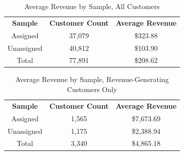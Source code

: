 \documentclass[11pt]{article}
\begin{document}
\begin{center}
\begin{table}[h]
    \centering
    \begin{tabular}{|c|c|c|}
    \hline
     \textbf{Sample} & \textbf{Customer Count} & \textbf{Average Revenue}\\ 
     Assigned & 37,079  & \$323.88 \\
     Unassigned & 40,812 &\$103.90 \\
     Total & 77,891 & \$208.62 \\ 
     \hline 
\end{tabular}
    \caption{Average Revenue by Sample, All Customers}
\end{table}
\end{center}
\begin{center}
\begin{table}[h!]
    \centering
    \begin{tabular}{|c|c|c|}
    \hline
     \textbf{Sample} & \textbf{Customer Count} & \textbf{Average Revenue}\\ 
     Assigned & 1,565  & \$7,673.69 \\
     Unassigned & 1,175 & \$2,388.94 \\
     Total & 3,340 & \$4,865.18 \\
     \hline 
\end{tabular}
    \caption{Average Revenue by Sample, Revenue-Generating Customers Only}
\end{table}
\end{center}

\newpage 
\end{document}
